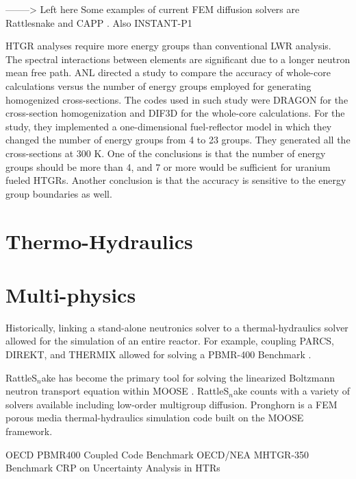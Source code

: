 \documentclass[11pt,letterpaper]{article}
\begin{document}
--------> Left here
Some examples of current \gls{FEM} diffusion solvers are Rattlesnake \cite{wang_rattlesnake_2019} and CAPP \cite{lee_development_2011}.
Also INSTANT-P1




\gls{HTGR} analyses require more energy groups than conventional \gls{LWR} analysis.
The spectral interactions between elements are significant due to a longer neutron mean free path.
\gls{ANL} directed a study \cite{lee_status_2006} to compare the accuracy of whole-core calculations versus the number of energy groups employed for generating homogenized cross-sections.
The codes used in such study were DRAGON for the cross-section homogenization and DIF3D for the whole-core calculations.
For the study, they implemented a one-dimensional fuel-reflector model in which they changed the number of energy groups from 4 to 23 groups.
They generated all the cross-sections at 300 K.
One of the conclusions is that the number of energy groups should be more than 4, and 7 or more would be sufficient for uranium fueled \glspl{HTGR}.
Another conclusion is that the accuracy is sensitive to the energy group boundaries as well.









\section{Thermo-Hydraulics}

\section{Multi-physics}

Historically, linking a stand-alone neutronics solver to a thermal-hydraulics solver allowed for the simulation of an entire reactor.
For example, coupling PARCS, DIREKT, and THERMIX \cite{seker_analysis_2006} allowed for solving a \gls{PBMR}-400 Benchmark \cite{reitsma_oecdneansc_2006}.

RattleS$_n$ake \cite{wang_nonlinear_2013} has become the primary tool for solving the linearized Boltzmann neutron transport equation within \gls{MOOSE} \cite{strydom_inl_2013}.
RattleS$_n$ake counts with a variety of solvers available including low-order multigroup diffusion.
Pronghorn \cite{bingham_pronghorn_2012} \cite{novak_pronghorn_2018} is a \gls{FEM} porous media thermal-hydraulics simulation code built on the \gls{MOOSE} framework.

OECD PBMR400 Coupled Code Benchmark %
OECD/NEA MHTGR-350 Benchmark %
CRP on Uncertainty Analysis in HTRs %
\cite{gougar_htgr_2016}


\pagebreak


\end{document}
